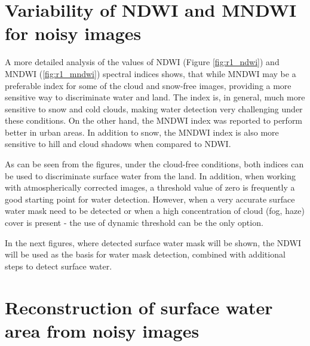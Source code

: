 \section{Variability of NDWI and MNDWI for noisy images}

A more detailed analysis of the values of NDWI (Figure \ref{fig:r1_ndwi}) and MNDWI (\ref{fig:r1_mndwi}) spectral indices shows, that while MNDWI may be a preferable index for some of the cloud and snow-free images, providing a more sensitive way to discriminate water and land. The index is, in general, much more sensitive to snow and cold clouds, making water detection very challenging under these conditions. On the other hand, the MNDWI index was reported to perform better in urban areas. In addition to snow, the MNDWI index is also more sensitive to hill and cloud shadows when compared to NDWI. 


As can be seen from the figures, under the cloud-free conditions, both indices can be used to discriminate surface water from the land. In addition, when working with atmospherically corrected images, a threshold value of zero is frequently a good starting point for water detection. However, when a very accurate surface water mask need to be detected or when a high concentration of cloud (fog, haze) cover is present - the use of dynamic threshold can be the only option.

In the next figures, where detected surface water mask will be shown, the NDWI will be used as the basis for water mask detection, combined with additional steps to detect surface water. 

\section{Reconstruction of surface water area from noisy images}


